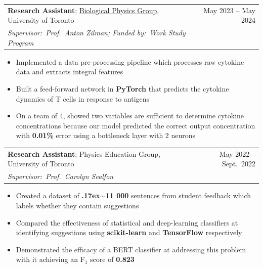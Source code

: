 \documentclass[letterpaper,11pt]{article}
\makeatletter
\newcommand{\resumeItem}[1]{
  \item\small{
    {#1 \vspace{-2pt}}
  }
}
\newcommand{\resumeSubheading}[5]{
  \vspace{-2pt}\item
    \begin{tabular*}{0.97\textwidth}[t]{l@{\extracolsep{\fill}}r}
      \small{\textbf{#1}; {#2}} & \small{#3} \\[-0.05em]
      \textit{\small{#4}} & \textit{\small #5}
    \end{tabular*}\vspace{-7pt}
}
\newcommand{\resumeItemListStart}{\begin{itemize}}
\newcommand{\resumeItemListEnd}{\end{itemize}\vspace{-5pt}}
\makeatother
\begin{document}

\resumeSubheading
{Research Assistant}{\href{https://www.physics.utoronto.ca/~zilmana/}{Biological Physics Group}, University of Toronto \href{https://github.com/ff-zhang/t-cell-response-encoder/tree/master}{\footnotesize\faIcon{external-link-alt}}}{May 2023 -- May 2024}
{Supervisor:\ Prof.\ Anton Zilman; Funded by:\ Work Study Program}{}
  \resumeItemListStart
  \resumeItem{Implemented a data pre-processing pipeline which processes raw cytokine data and extracts integral features}
  \resumeItem{Built a feed-forward network in \textbf{PyTorch} that predicts the cytokine dynamics of T cells in response to antigens}
  \resumeItem{On a team of $4$, showed two variables are sufficient to determine cytokine concentrations because our model predicted the correct output concentration with \textbf{0.01\%} error using a bottleneck layer with $2$ neurons}
  \resumeItemListEnd
    
\resumeSubheading
{Research Assistant}{Physics Education Group, University of Toronto \href{https://github.com/ff-zhang/extracting-suggestions}{\footnotesize\faIcon{external-link-alt}}}{May 2022 -- Sept.\ 2022}
{Supervisor:\ Prof.\ Carolyn Sealfon}{}
  \resumeItemListStart
  \resumeItem{Created a dataset of \textbf{{\raise.17ex\hbox{$\scriptstyle\mathtt{\sim}$}}11 000} sentences from student feedback which labels whether they contain suggestions}
  \resumeItem{Compared the effectiveness of statistical and deep-learning classifiers at identifying suggestions using \textbf{scikit-learn} and  \textbf{TensorFlow} respectively}
  \resumeItem{Demonstrated the efficacy of a BERT classifier at addressing this problem with it achieving an F${}_1$ score of \textbf{0.823}}
  \resumeItemListEnd
\end{document}
